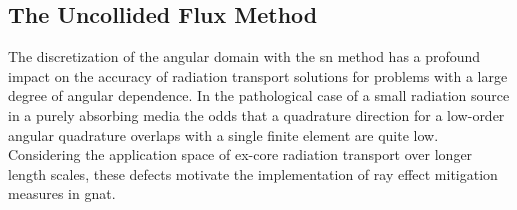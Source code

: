 \subsection{The Uncollided Flux Method}
\label{solver:radiation_transport:uncollided_method}

The discretization of the angular domain with the \acrshort{sn} method has a profound impact on the accuracy of radiation transport solutions for problems with a large degree of angular dependence. In the pathological case of a small radiation source in a purely absorbing media the odds that a quadrature direction for a low-order angular quadrature overlaps with a single finite element are quite low. Considering the application space of ex-core radiation transport over longer length scales, these defects motivate the implementation of ray effect mitigation measures in \acrshort{gnat}.

